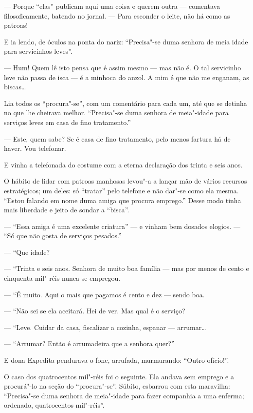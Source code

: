 --- Porque ``elas'' publicam aqui uma coisa e querem outra --- comentava
filosoficamente, batendo no jornal. --- Para esconder o leite, não há
como as patroas!

E ia lendo, de óculos na ponta do nariz: ``Precisa"-se duma senhora de
meia idade para servicinhos leves''.

--- Hum! Quem lê isto pensa que é assim mesmo --- mas não é. O tal
servicinho leve não passa de isca --- é a minhoca do anzol. A mim é que
não me enganam, as biscas\ldots{}

Lia todos os ``procura"-se'', com um comentário para cada um, até que se
detinha no que lhe cheirava melhor. ``Precisa"-se duma senhora de
meia"-idade para serviços leves em casa de fino tratamento.''

--- Este, quem sabe? Se é casa de fino tratamento, pelo menos fartura há
de haver. Vou telefonar.

E vinha a telefonada do costume com a eterna declaração dos trinta e
seis anos.

O hábito de lidar com patroas manhosas levou"-a a lançar mão de vários
recursos estratégicos; um deles: só ``tratar'' pelo telefone e não
dar"-se como ela mesma. ``Estou falando em nome duma amiga que procura
emprego.'' Desse modo tinha mais liberdade e jeito de sondar a
``bisca''.

--- ``Essa amiga é uma excelente criatura'' --- e vinham bem dosados
elogios. --- ``Só que não gosta de serviços pesados.''

--- ``Que idade?

--- ``Trinta e seis anos. Senhora de muito boa família --- mas por menos
de cento e cinquenta mil"-réis nunca se empregou.

--- ``É muito. Aqui o mais que pagamos é cento e dez --- sendo boa.

--- ``Não sei se ela aceitará. Hei de ver. Mas qual é o serviço?

--- ``Leve. Cuidar da casa, fiscalizar a cozinha, espanar --- arrumar\ldots{}

--- ``Arrumar? Então é arrumadeira que a senhora quer?''

E dona Expedita pendurava o fone, arrufada, murmurando: ``Outro
ofício!''.

O caso dos quatrocentos mil"-réis foi o seguinte. Ela andava sem emprego
e a procurá"-lo na seção do ``procura"-se''. Súbito, esbarrou com esta
maravilha: ``Precisa"-se duma senhora de meia"-idade para fazer companhia
a uma enferma; ordenado, quatrocentos mil"-réis''.

